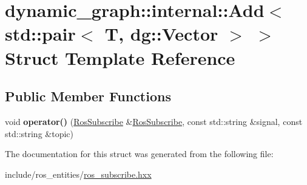 \hypertarget{structdynamic__graph_1_1internal_1_1Add_3_01std_1_1pair_3_01T_00_01dg_1_1Vector_01_4_01_4}{}\section{dynamic\+\_\+graph\+:\+:internal\+:\+:Add$<$ std\+:\+:pair$<$ T, dg\+:\+:Vector $>$ $>$ Struct Template Reference}
\label{structdynamic__graph_1_1internal_1_1Add_3_01std_1_1pair_3_01T_00_01dg_1_1Vector_01_4_01_4}
\subsection*{Public Member Functions}
\begin{DoxyCompactItemize}
\item 
\mbox{\label{structdynamic__graph_1_1internal_1_1Add_3_01std_1_1pair_3_01T_00_01dg_1_1Vector_01_4_01_4_af6641e84d4c979827f56b5df1570b1a5}} 
void {\bfseries operator()} (\hyperlink{classdynamic__graph_1_1RosSubscribe}{Ros\+Subscribe} \&\hyperlink{classdynamic__graph_1_1RosSubscribe}{Ros\+Subscribe}, const std\+::string \&signal, const std\+::string \&topic)
\end{DoxyCompactItemize}


The documentation for this struct was generated from the following file\+:\begin{DoxyCompactItemize}
\item 
include/ros\+\_\+entities/\hyperlink{ros__subscribe_8hxx}{ros\+\_\+subscribe.\+hxx}\end{DoxyCompactItemize}

